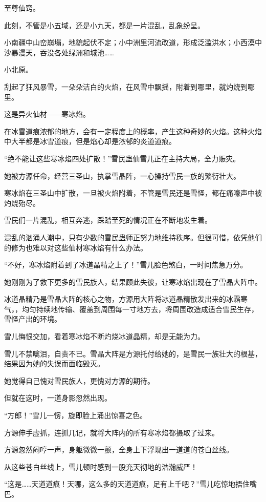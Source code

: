 \begin{this_body}
至尊仙窍。

此刻，不管是小五域，还是小九天，都是一片混乱，乱象纷呈。

小南疆中山峦崩塌，地貌起伏不定；小中洲里河流改道，形成泛滥洪水；小西漠中沙暴漫天，吞没各处绿洲和城池……

小北原。

刮起了狂风暴雪，一朵朵洁白的火焰，在风雪中飘摇，附着到哪里，就灼烧到哪里。

这是异火仙材——寒冰焰。

在冰雪道痕浓郁的地方，会有一定程度上的概率，产生这种奇妙的火焰。这种火焰中大半都是冰雪道痕，但是焰心却是浓郁的炎道道痕。

“绝不能让这些寒冰焰四处扩散！”雪民蛊仙雪儿正在主持大局，全力赈灾。

她被方源任命，经营三圣山，执掌雪晶阵，一心操持雪民一族的繁衍壮大。

寒冰焰在三圣山中扩散，一旦被火焰附着，不管是雪民还是雪怪，都在痛嚎声中被灼烧殆尽。

雪民们一片混乱，相互奔逃，踩踏至死的情况正在不断地发生着。

混乱的汹涌人潮中，只有少数的雪民蛊师正努力地维持秩序。但很可惜，依凭他们的修为也难以对这些仙材寒冰焰有什么办法。

“不好，寒冰焰附着到了冰道晶精之上了！”雪儿脸色煞白，一时间焦急万分。

她刚刚为了救下更多的雪民族人，结果顾此失彼，让寒冰焰出现在了雪晶大阵中。

冰道晶精乃是雪晶大阵的核心之物，方源用大阵将冰道晶精散发出来的冰霜寒气，，均匀持续地传输、覆盖到周围每一寸地方去，将周围改造成适合雪民生存，雪怪产出的环境。

雪儿悔恨交加，看着寒冰焰不断灼烧冰道晶精，却是无能为力。

雪儿不禁噙泪，自责不已。雪晶大阵是方源托付给她的，是雪民一族壮大的根基，结果因为她的失误而面临毁灭。

她觉得自己愧对雪民族人，更愧对方源的期待。

但就在这时，一道身影忽然出现。

“方郎！”雪儿一愣，旋即脸上涌出惊喜之色。

方源伸手虚抓，连抓几记，就将大阵内的所有寒冰焰都摄取了过来。

方源忽然闷哼一声，身躯微微一颤，全身上下浮现出一道道的苍白丝线。

从这些苍白丝线上，雪儿顿时感到一股充天彻地的浩瀚威严！

“这是……天道道痕！天哪，这么多的天道道痕，足有上千吧？”雪儿吃惊地捂住嘴巴。


\end{this_body}

